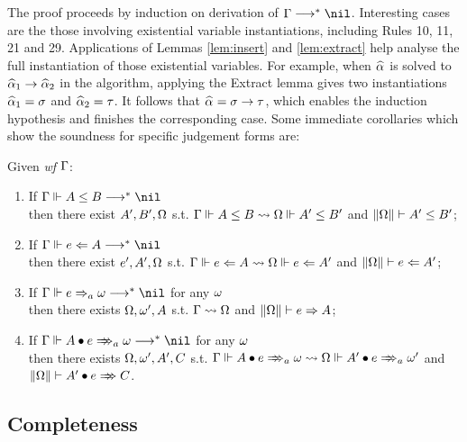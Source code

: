 The proof proceeds by induction on derivation of $\Gm\redto\nil$.
Interesting cases are the those involving existential variable instantiations,
including Rules 10, 11, 21 and 29.
Applications of Lemmas \ref{lem:insert} and \ref{lem:extract}
help analyse the full instantiation of those existential variables.
For example, when $\al$ is solved to $\al[1] \to \al[2]$ in the algorithm,
applying the Extract lemma gives two instantiations $\al[1] = \sigma$ and $\al[2] = \tau$.
It follows that $\al = \sigma \to \tau$, which enables the induction hypothesis
and finishes the corresponding case. Some immediate corollaries which
show the soundness for specific judgement forms are: 


\begin{corollary}
Given \emph{wf }$\Gamma$:
\begin{enumerate}
    \item If $\Gm \Vdash A \le B \redto \nil$\\
        then there exist $A', B', \Omega$ s.t.
        $\Gamma \Vdash A \le B \rightsquigarrow \Omega \Vdash A' \le B'$ and $\|\Omega\| \vdash A' \le B'$;
    \item If $\Gm \Vdash e \Lto A \redto \nil$\\
        then there exist $e', A', \Omega$ s.t.
        $\Gamma \Vdash e \Leftarrow A \rightsquigarrow \Omega \Vdash e \Leftarrow A'$ and $\|\Omega\| \vdash e \Leftarrow A'$;
    \item If $\Gm \Vdash e \To_a \jg \redto \nil$ for any $\omega$\\
        then there exists $\Omega, \omega', A$ s.t.
        $\Gamma \rightsquigarrow \Omega$ and $\|\Omega\| \vdash e \Rightarrow A$;
    \item If $\Gm \Vdash \appInfAlg{A}{e} \redto \nil$ for any $\omega$\\
        then there exists $\Omega, \omega', A', C$ s.t.
        $\Gm \Vdash \appInfAlg{A}{e} \sto \Om \Vdash \appInfAlg{A'}{e}[a][\jg']$
            and $\|\Om\| \vdash \appInf{A'}{e}{C}$.
\end{enumerate}
\end{corollary}

\subsection{Completeness}

